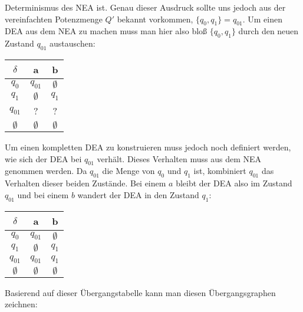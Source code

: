 \begin{flushleft}
    Determinismus des NEA ist. Genau dieser Ausdruck sollte uns jedoch aus der vereinfachten Potenzmenge 
    $Q'$ bekannt vorkommen, $\{q_0,q_1\}=q_{01}$. Um einen DEA aus dem NEA zu machen muss man hier also bloß 
    $\{q_0,q_1\}$ durch den neuen Zustand $q_{01}$ austauschen:
    \begin{center}
        \begin{tabular}{|c|c|c|}
            \hline
            $\delta$ & a & b \\
            \hline
            $q_0$ & $q_{01}$ & $\emptyset$ \\
            \hline
            $q_1$ & $\emptyset$ & $q_1$ \\
            \hline
            $q_{01}$ & ? & ? \\
            \hline
            $\emptyset$ & $\emptyset$ & $\emptyset$ \\
            \hline
        \end{tabular}
    \end{center}
    Um einen kompletten DEA zu konstruieren muss jedoch noch definiert werden, wie sich der DEA bei $q_{01}$ verhält.
    Dieses Verhalten muss aus dem NEA genommen werden. Da $q_{01}$ die Menge von $q_0$ und $q_1$ ist, kombiniert $q_{01}$
    das Verhalten dieser beiden Zustände. Bei einem $a$ bleibt der DEA also im Zustand $q_{01}$ und bei einem $b$ wandert 
    der DEA in den Zustand $q_1$:
    \begin{center}
        \begin{tabular}{|c|c|c|}
            \hline
            $\delta$ & a & b \\
            \hline
            $q_0$ & $q_{01}$ & $\emptyset$ \\
            \hline
            $q_1$ & $\emptyset$ & $q_1$ \\
            \hline
            $q_{01}$ & $q_{01}$ & $q_1$ \\
            \hline
            $\emptyset$ & $\emptyset$ & $\emptyset$ \\
            \hline
        \end{tabular}
    \end{center}
    Basierend auf dieser Übergangstabelle kann man diesen Übergangsgraphen zeichnen:
    \begin{center}
\end{center}
\end{flushleft}
